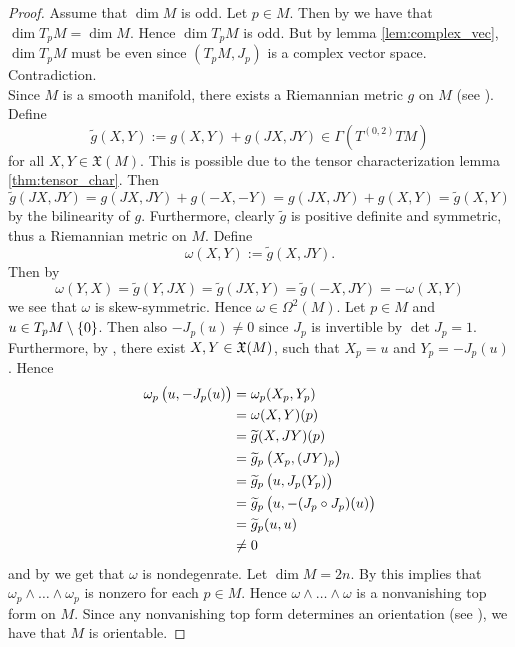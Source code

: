\begin{proof}
Assume that $\dim M$ is odd. Let $p \in M$. Then by \cite[57]{lee:smooth_manifolds:2013} we have that $\dim T_p M = \dim M$. Hence $\dim T_pM$ is odd. But by lemma \ref{lem:complex_vec}, $\dim T_p M$ must be even since $(T_pM,J_p)$ is a complex vector space. Contradiction.\\
Since $M$ is a smooth manifold, there exists a Riemannian metric $g$ on $M$ (see \cite[329]{lee:smooth_manifolds:2013}). Define 
\begin{equation*}
\widetilde{g}(X,Y) := g(X,Y) + g(JX,JY) \in \Gamma(T^{(0,2)}TM)
\end{equation*}
\noindent for all $X,Y \in \mathfrak{X}(M)$. This is possible due to the tensor characterization lemma \ref{thm:tensor_char}. Then
\begin{equation*}
\widetilde{g}(JX,JY) = g(JX,JY) + g(-X,-Y) = g(JX,JY) + g(X,Y) = \widetilde{g}(X,Y)
\end{equation*}
\noindent by the bilinearity of $g$. Furthermore, clearly $\widetilde{g}$ is positive definite and symmetric, thus a Riemannian metric on $M$. Define
\begin{equation*}
\omega(X,Y) := \widetilde{g}(X,JY).
\end{equation*}
Then by
\begin{equation*}
\omega(Y,X) = \widetilde{g}(Y,JX) = \widetilde{g}(JX,Y) = \widetilde{g}(-X,JY) = -\omega(X,Y)
\end{equation*}
\noindent we see that $\omega$ is skew-symmetric. Hence $\omega \in \Omega^2(M)$. Let $p \in M$ and $u \in T_pM \setminus \cbr{0}$. Then also $-J_p(u) \neq 0$ since $J_p$ is invertible by $\det J_p = 1$. Furthermore, by \cite[177]{lee:smooth_manifolds:2013}, there exist $X,Y \in \mathfrak{X}(M)$, such that $X_p = u$ and $Y_p = -J_p(u)$. Hence
\begin{align*}
\omega_p\del[1]{u,-J_p(u)} &= \omega_p(X_p,Y_p)\\
&= \omega(X,Y)(p)\\
&= \widetilde{g}(X,JY)(p)\\
&= \widetilde{g}_p\del[1]{X_p,(JY)_p}\\
&= \widetilde{g}_p\del[1]{u,J_p(Y_p)}\\
&= \widetilde{g}_p\del[1]{u,-(J_p \circ J_p)(u)}\\
&= \widetilde{g}_p(u,u)\\
&\neq 0
\end{align*}
\noindent and by \cite[565]{lee:smooth_manifolds:2013} we get that $\omega$ is nondegenrate. Let $\dim M = 2n$. By \cite[567]{lee:smooth_manifolds:2013} this implies that $\omega_p \wedge \dots \wedge \omega_p$ is nonzero for each $p \in M$. Hence $\omega \wedge \dots \wedge \omega$ is a nonvanishing top form on $M$. Since any nonvanishing top form determines an orientation (see \cite[381]{lee:smooth_manifolds:2013}), we have that $M$ is orientable.
\end{proof}


